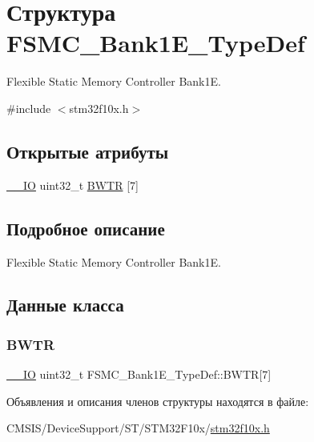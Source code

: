 \hypertarget{struct_f_s_m_c___bank1_e___type_def}{}\section{Структура F\+S\+M\+C\+\_\+\+Bank1\+E\+\_\+\+Type\+Def}
\label{struct_f_s_m_c___bank1_e___type_def}


Flexible Static Memory Controller Bank1E.  




{\ttfamily \#include $<$stm32f10x.\+h$>$}

\subsection*{Открытые атрибуты}
\begin{DoxyCompactItemize}
\item 
\mbox{\hyperlink{group___c_m_s_i_s___c_m3__core__definitions_gaec43007d9998a0a0e01faede4133d6be}{\+\_\+\+\_\+\+IO}} uint32\+\_\+t \mbox{\hyperlink{struct_f_s_m_c___bank1_e___type_def_afe650877ca972faff9c61fcb364c7b66}{B\+W\+TR}} \mbox{[}7\mbox{]}
\end{DoxyCompactItemize}


\subsection{Подробное описание}
Flexible Static Memory Controller Bank1E. 

\subsection{Данные класса}
\mbox{\label{struct_f_s_m_c___bank1_e___type_def_afe650877ca972faff9c61fcb364c7b66}} 
\subsubsection{\texorpdfstring{BWTR}{BWTR}}
{\footnotesize\ttfamily \mbox{\hyperlink{group___c_m_s_i_s___c_m3__core__definitions_gaec43007d9998a0a0e01faede4133d6be}{\+\_\+\+\_\+\+IO}} uint32\+\_\+t F\+S\+M\+C\+\_\+\+Bank1\+E\+\_\+\+Type\+Def\+::\+B\+W\+TR\mbox{[}7\mbox{]}}



Объявления и описания членов структуры находятся в файле\+:\begin{DoxyCompactItemize}
\item 
C\+M\+S\+I\+S/\+Device\+Support/\+S\+T/\+S\+T\+M32\+F10x/\mbox{\hyperlink{stm32f10x_8h}{stm32f10x.\+h}}\end{DoxyCompactItemize}
